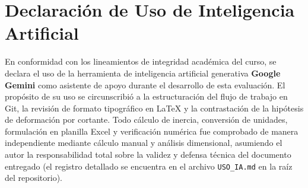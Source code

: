 \documentclass[11pt,a4paper]{article}
\begin{document}
\section*{Declaración de Uso de Inteligencia Artificial}
En conformidad con los lineamientos de integridad académica del curso, se declara el uso de la herramienta de inteligencia artificial generativa \textbf{Google Gemini} como asistente de apoyo durante el desarrollo de esta evaluación. El propósito de su uso se circunscribió a la estructuración del flujo de trabajo en Git, la revisión de formato tipográfico en \LaTeX{} y la contrastación de la hipótesis de deformación por cortante. Todo cálculo de inercia, conversión de unidades, formulación en planilla Excel y verificación numérica fue comprobado de manera independiente mediante cálculo manual y análisis dimensional, asumiendo el autor la responsabilidad total sobre la validez y defensa técnica del documento entregado (el registro detallado se encuentra en el archivo \texttt{USO\_IA.md} en la raíz del repositorio).



\end{document}

